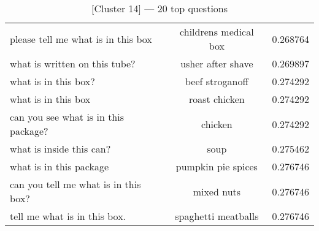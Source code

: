 \begin{table}[!th]
{\begin{tabular}{lcr}
			please tell me what is in this box            & childrens medical box & 0.268764          \\
			what is written on this tube?                 & usher after shave     & 0.269897          \\
			what is in this box?                          & beef stroganoff       & 0.274292          \\
			what is in this box                           & roast chicken         & 0.274292          \\
			can you see what is in this package?          & chicken               & 0.274292          \\
			what is inside this can?                      & soup                  & 0.275462          \\
			what is in this package                       & pumpkin pie spices    & 0.276746          \\
			can you tell me what is in this box?          & mixed nuts            & 0.276746          \\
			tell me what is in this box.                  & spaghetti meatballs   & 0.276746          \\
			\bottomrule
		\end{tabular}}
	\caption{[Cluster 14] --- 20 top questions}
	\vspace{-5mm}
\end{table}


